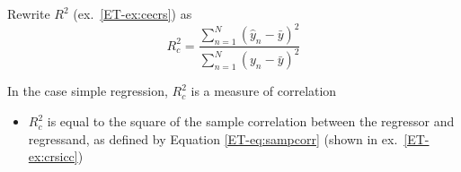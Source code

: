 \begin{frame}

    Rewrite $R^2$ (ex.~\ref{ET-ex:cecrs}) as
    \begin{equation*}
        \label{eq:cecrs}
        R_c^2 = \frac{ \sum_{n=1}^N (\hat y_n - \bar y )^2 }
                { \sum_{n=1}^N (y_n - \bar y )^2 }
    \end{equation*}
    
    \vspace{.7em}
    In the case simple regression, $R_c^2$ is a measure of correlation
    
    \begin{itemize}
        \item $R_c^2$ is equal to the square of the
    sample correlation between the regressor and regressand, as defined by
    Equation \ref{ET-eq:sampcorr} (shown in ex.~\eqref{ET-ex:crsicc})
    \end{itemize}
    
\end{frame}




